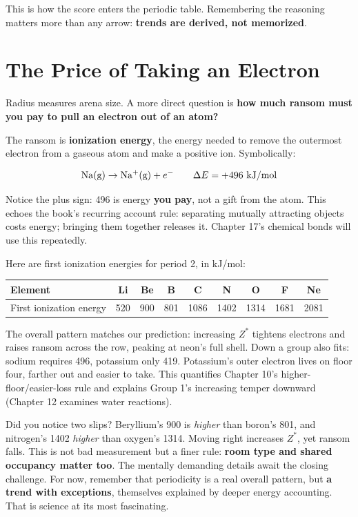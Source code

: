 This is how the score enters the periodic table. Remembering the reasoning matters more than any arrow: \textbf{trends are derived, not memorized}.

\section{The Price of Taking an Electron}

Radius measures arena size. A more direct question is \textbf{how much ransom must you pay to pull an electron out of an atom?}

The ransom is \textbf{ionization energy}, the energy needed to remove the outermost electron from a gaseous atom and make a positive ion. Symbolically:

\[\chem{Na(g)} \rightarrow \chem{Na^{+}(g)} + e^{-} \qquad \Delta E = +496\ \mathrm{kJ/mol}\]

Notice the plus sign: 496 is energy \textbf{you pay}, not a gift from the atom. This echoes the book's recurring account rule: separating mutually attracting objects costs energy; bringing them together releases it. Chapter 17's chemical bonds will use this repeatedly.

Here are first ionization energies for period 2, in kJ/mol:

\begin{table}[htbp]
\centering
\begin{tabular}{lcccccccc}
\toprule
Element & Li & Be & B & C & N & O & F & Ne \\
\midrule
First ionization energy & 520 & 900 & 801 & 1086 & 1402 & 1314 & 1681 & 2081 \\
\bottomrule
\end{tabular}
\end{table}

The overall pattern matches our prediction: increasing $Z^{*}$ tightens electrons and raises ransom across the row, peaking at neon's full shell. Down a group also fits: sodium requires 496, potassium only 419. Potassium's outer electron lives on floor four, farther out and easier to take. This quantifies Chapter 10's higher-floor/easier-loss rule and explains Group 1's increasing temper downward (Chapter 12 examines water reactions).

Did you notice two slips? Beryllium's 900 is \emph{higher} than boron's 801, and nitrogen's 1402 \emph{higher} than oxygen's 1314. Moving right increases $Z^{*}$, yet ransom falls. This is not bad measurement but a finer rule: \textbf{room type and shared occupancy matter too}. The mentally demanding details await the closing challenge. For now, remember that periodicity is a real overall pattern, but \textbf{a trend with exceptions}, themselves explained by deeper energy accounting. That is science at its most fascinating.

